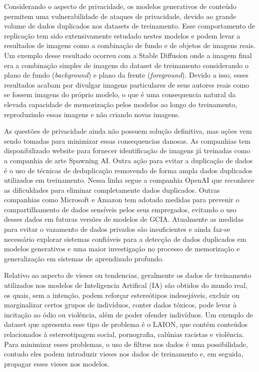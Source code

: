 Considerando o aspecto de privacidade, os modelos generativos de conteúdo permitem uma vulnerabilidade de ataques de privacidade,
devido ao grande volume de dados duplicados nos datasets de treinamento. 
Esse comportamento de replicação tem sido extensivamente estudado nestes modelos e podem levar 
a resultados de imagens como a combinação de fundo e de objetos de imagens reais. Um exemplo desse resultado 
ocorreu com a Stable Diffusion onde a imagem  final era a combinação simples de imagens do dataset de treinamento 
considerando o plano de fundo (\textit{background}) e plano da frente (\textit{foreground}). Devido a isso, 
esses resultados acabam por divulgar imagens particulares de seus autores reais como se fossem 
imagens do próprio modelo, o que é uma consequencia natural da elevada capacidade de memorização pelos modelos ao longo
do treinamento, reproduzindo essas imagens e não criando novas imagens.

As questões de privacidade ainda não possuem solução definitiva, mas ações vem sendo tomadas para minimizar essas consequencias 
danosas. As companhias tem disponibilizado website para fornecer identificação de imagens já treinadas como a 
companhia de arte Spawning AI. 
Outra ação para evitar a duplicação de dados é o uso de técnicas de deduplicação removendo de forma ampla dados
duplicados utilizados em treinamento. Nessa linha segue a companhia OpenAI que reconhece as dificuldades para eliminar 
completamente dados duplicados. 
Outras companhias como Microsoft e Amazon tem adotado medidas para prevenir o compartilhamento de dados sensíveis pelos seus empregados, 
evitando o uso desses dados em futuras versões de modelos de GCIA.
Atualmente as medidas para evitar o vazamento de dados privados são insuficientes e 
ainda faz-se necessário explorar sistemas confiáveis para a detecção de dados duplicados em modelos generativos e uma 
maior investigação no processo de memorização e generalização em sistemas de aprendizado profundo.

Relativo ao aspecto de vieses ou tendencias, geralmente os dados de treinamento 
utilizados nos modelos de Inteligencia Artifical (IA) são obtidos do mundo real,
os quais, sem a intenção, podem reforçar estereótipos indesejáveis, excluir ou marginalizar certos grupos de indivíduos, 
conter dados tóxicos, pode levar à incitação ao ódio ou violência, além de poder ofender indivíduos. 
Um exemplo de dataset que apresenta esse tipo de problema é o LAION, que contém conteúdos relacionados à estereotipagem social,
pornografia, calúnias racistas e violência. Para minimizar esses problemas, o uso de filtros nos dados é uma possibilidade,
contudo eles podem introduzir vieses nos dados de treinamento e, em seguida, propagar esses vieses nos modelos.

